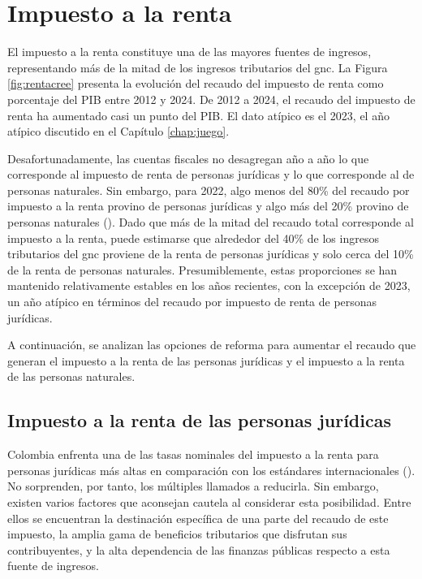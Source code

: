 \section{Impuesto a la renta}



El impuesto a la renta constituye una de las mayores fuentes de ingresos, representando más de la mitad de los ingresos tributarios del \gls{gnc}. La Figura \ref{fig:rentacree} presenta la evolución del recaudo del impuesto de renta como porcentaje del PIB entre 2012 y 2024. De 2012 a 2024, el recaudo del impuesto de renta ha aumentado casi un punto del PIB. El dato atípico es el 2023, el año atípico discutido en el Capítulo \ref{chap:juego}. 

Desafortunadamente, las cuentas fiscales no desagregan año a año lo que corresponde al impuesto de renta de personas jurídicas y lo que corresponde al de personas naturales. Sin embargo, para 2022, algo menos del 80\% del recaudo por impuesto a la renta provino de personas jurídicas y algo más del 20\% provino de personas naturales (\cite{OCDEColTax}). Dado que más de la mitad del recaudo total corresponde al impuesto a la renta, puede estimarse que alrededor del 40\% de los ingresos tributarios del \gls{gnc} proviene de la renta de personas jurídicas y solo cerca del 10\% de la renta de personas naturales. Presumiblemente, estas proporciones se han mantenido relativamente estables en los años recientes, con la excepción de 2023, un año atípico en términos del recaudo por impuesto de renta de personas jurídicas.

A continuación, se analizan las opciones de reforma para aumentar el recaudo que generan el impuesto a la renta de las personas jurídicas y el impuesto a la renta de las personas naturales.

\subsection{Impuesto a la renta de las personas jurídicas}

Colombia enfrenta una de las tasas nominales del impuesto a la renta para personas jurídicas más altas en comparación con los estándares internacionales (\cite{oecd2024corporate}). No sorprenden, por tanto, los múltiples llamados a reducirla. Sin embargo, existen varios factores que aconsejan cautela al considerar esta posibilidad. Entre ellos se encuentran la destinación específica de una parte del recaudo de este impuesto, la amplia gama de beneficios tributarios que disfrutan sus contribuyentes, y la alta dependencia de las finanzas públicas respecto a esta fuente de ingresos.


